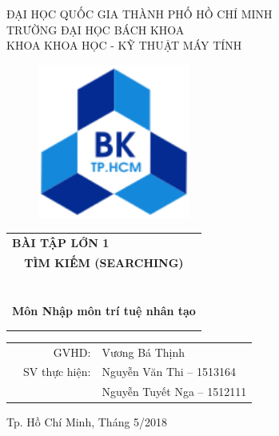 \documentclass[11pt,a4paper]{article}
\begin{document}
\begin{titlepage}
\begin{center}
ĐẠI HỌC QUỐC GIA THÀNH PHỐ HỒ CHÍ MINH \\
TRƯỜNG ĐẠI HỌC BÁCH KHOA \\
KHOA KHOA HỌC - KỸ THUẬT MÁY TÍNH 
\end{center}

\vspace{1cm}

\begin{figure}[h!]
\begin{center}
\includegraphics[width=5cm]{Images/hcm.png}
\end{center}
\end{figure}

\vspace{1cm}


\begin{center}
\begin{tabular}{c}
\multicolumn{1}{l}{\centerline{\textbf{{\Large BÀI TẬP LỚN 1 }}}}\\
\textbf{{\Huge TÌM KIẾM (SEARCHING)}}\\
~~\\
\hline
\\
\\
\textbf{{\Huge Môn Nhập môn trí tuệ nhân tạo}} \\
\\
\hline
\\
\end{tabular}
\end{center}

\vspace{1cm}

\begin{table}[h]
\begin{tabular}{rrl}
\hspace{5 cm} & GVHD: & Vương Bá Thịnh\\

& SV thực hiện: & Nguyễn Văn Thi -- 1513164 \\
& & Nguyễn Tuyết Nga -- 1512111 \\
\end{tabular}
\end{table}

\vspace{0.75cm}
\begin{center}
{\footnotesize Tp. Hồ Chí Minh, Tháng 5/2018}
\end{center}
\end{titlepage} 
\end{document}
